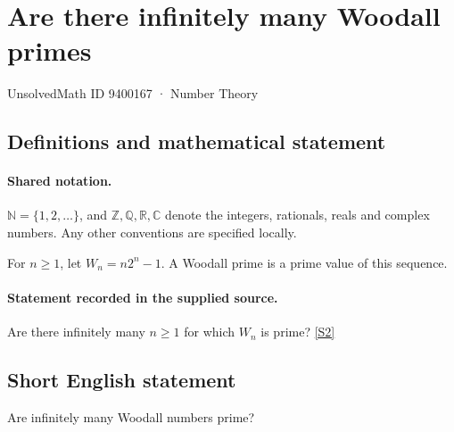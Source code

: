 \documentclass[11pt]{article}
\newcommand{\sref}[2]{\hyperlink{source:#1:#2}{[S#2]}}
\begin{document}
\setcounter{section}{9400166}
\section{Are there infinitely many Woodall primes}\label{9400167}
{\small\sffamily UnsolvedMath ID 9400167 · Number Theory}
\subsection{Definitions and mathematical statement}

\paragraph{Shared notation.}$\mathbb N=\{1,2,\ldots\}$, and $\mathbb Z,\mathbb Q,\mathbb R,\mathbb C$ denote the integers, rationals, reals and complex numbers. Any other conventions are specified locally.


For $n\ge1$, let $W_n=n2^n-1$. A Woodall prime is a prime value of this sequence.
\paragraph{Statement recorded in the supplied source.}
Are there infinitely many $n\ge1$ for which $W_n$ is prime? \sref{9400167}{2}
\subsection{Short English statement}
Are infinitely many Woodall numbers prime?
\end{document}
